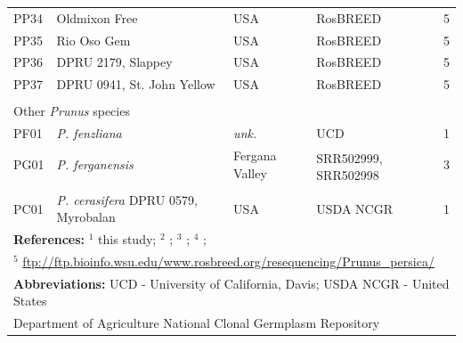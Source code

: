 \documentclass[12pt]{article}
\begin{document}
\begin{center}
\begin{longtable}{llllc}
	PP34 &Oldmixon Free &USA &RosBREED &5\\
	PP35 &Rio Oso Gem &USA &RosBREED &5\\
	PP36 &DPRU 2179, Slappey &USA &RosBREED &5\\
	PP37 &DPRU 0941, St. John Yellow &USA &RosBREED &5\\
	\\
	\multicolumn{5}{l}{Other \emph{Prunus} species}  \\
	PF01 &\emph{P. fenzliana} &\emph{unk.} &UCD &1\\
	PG01 &\emph{P. ferganensis} &Fergana Valley &
	\multirow{2}{1cm}{SRR502999, SRR502998} &3\\
	\\
	PC01 &\emph{P. cerasifera} DPRU 0579, Myrobalan &USA &USDA NCGR &1\\ \hline \hline
	\multicolumn{5}{l}{\textbf{References:} $^{1}$ this study; $^{2}$ \citealp{koepke2013comparative}; $^{3}$ \citealp{verde2013high}; $^{4}$ \citealp{ahmad2011whole};}\\
	\multicolumn{5}{l}{$^{5}$ \url{ftp://ftp.bioinfo.wsu.edu/www.rosbreed.org/resequencing/Prunus_persica/}}\\
	\multicolumn{5}{l}{\textbf{Abbreviations:} UCD - University of California, Davis; USDA NCGR - United States}\\
	\multicolumn{5}{l}{Department of Agriculture National Clonal Germplasm Repository}
\end{longtable}
\end{center}
%
\pagebreak
%
\end{document}
